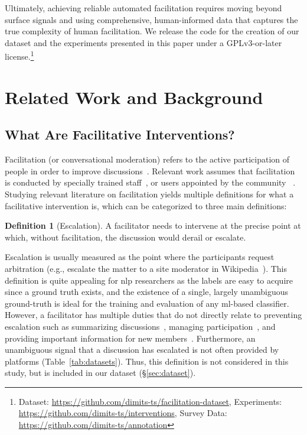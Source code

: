 \documentclass[11pt]{article}
\newcommand{\explink}{\url{https://github.com/dimits-ts/interventions}}
\newcommand{\datasetlink}{\url{https://github.com/dimits-ts/facilitation-dataset}}
\newcommand{\surveydatalink}{\url{https://github.com/dimits-ts/annotation}}
\theoremstyle{definition}
\newtheorem{definition}{Definition}
\theoremstyle{plain}
\begin{document}
Ultimately, achieving reliable automated facilitation requires moving beyond surface signals and using comprehensive, human-informed data that captures the true complexity of human facilitation. We release the code for the creation of our dataset and the experiments presented in this paper under a GPLv3-or-later license.\footnote{Dataset: \datasetlink, Experiments: \explink, Survey Data: \surveydatalink}


\section{Related Work and Background}
\label{sec:related}

\subsection{What Are Facilitative Interventions?}
\label{sec:related:interventions}

Facilitation (or conversational moderation) refers to the active participation of people in order to improve discussions~\citep{korre-etal-2025-evaluation}. Relevant work assumes that facilitation is conducted by specially trained staff~\citep{schroeder-etal-2024-fora, ceri, chen-etal-2025-whow}, or users appointed by the community ~\cite{schaffner_community_guidelines}. Studying relevant literature on facilitation yields multiple definitions for what a facilitative intervention is, which can be categorized to three main definitions:

\begin{definition}[Escalation]
	\label{def:escalation}
	A facilitator needs to intervene at the precise point at which, without facilitation, the discussion would derail or escalate.
\end{definition}

Escalation is usually measured as the point where the participants request arbitration (e.g., escalate the matter to a site moderator in Wikipedia~\cite{wikidisputes, cmv_awry2}). This definition is quite appealing for \ac{nlp} researchers as the labels are easy to acquire since a ground truth exists, and the existence of a single, largely unambiguous ground-truth is ideal for the training and evaluation of any \ac{ml}-based classifier. However, a facilitator has multiple duties that do not directly relate to preventing escalation such as summarizing discussions~\cite{small-polis-llm}, managing participation~\cite{chen-etal-2025-whow, schroeder-etal-2024-fora}, and providing important information for new members~\cite{ceri}. Furthermore, an unambiguous signal that a discussion has escalated is not often provided by platforms (Table~\ref{tab:datasets}). Thus, this definition is not considered in this study, but is included in our dataset (\S\ref{sec:dataset}).
\end{document}
